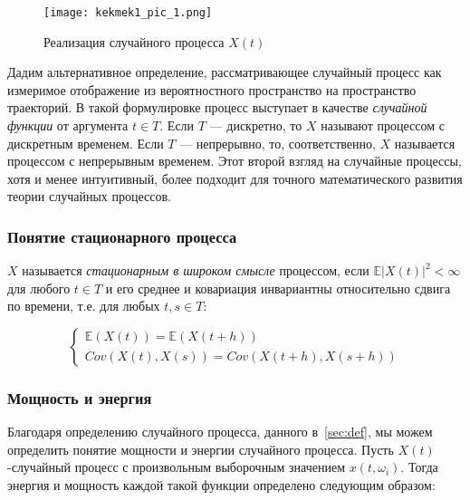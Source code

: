 \begin{figure}[b]
\centering
\texttt{[image: kekmek1\_pic\_1.png]}
\caption{Реализация случайного процесса $X(t)$}
\label{fig:X}
\end{figure}

Дадим альтернативное определение, рассматривающее случайный процесс как измеримое отображение из вероятностного пространство на пространство траекторий. В такой формулировке процесс выступает в качестве \textsl{случайной функции} от аргумента $t \in T$. Если $T$ — дискретно, то $X$ называют процессом с дискретным временем. Если $T$ — непрерывно, то, соответственно, $X$ называется процессом с непрерывным временем. Этот второй взгляд на случайные процессы, хотя и менее интуитивный, более подходит для точного математического развития теории случайных процессов.
\newpage
\subsubsection{Понятие стационарного процесса}


\begin{definition} $X$ называется \textsl{стационарным в широком смысле} процессом, если $\mathbb{E}|X(t)|^{2} < \infty$ для любого $t \in T$ и его среднее и ковариация инвариантны относительно сдвига по времени, т.е. для любых $t, s \in T$:

{\centering 
\begin{equation}
\left\{
    \begin{array}{lr}
        \mathbb{E}(X(t)) = \mathbb{E}(X(t+h)) \\
         Cov(X(t), X(s)) =  Cov(X(t+h), X(s+h))
    \end{array} 
\right.
\end{equation}
}
\end{definition}

\subsubsection{Мощность и энергия}
Благодаря определению случайного процесса, данного в~\ref{sec:def}, мы можем определить понятие мощности и энергии случайного процесса. Пусть $X(t)$-случайный процесс с произвольным выборочным значением $x(t, \omega_{i})$. Тогда энергия и мощность каждой такой функции определено следующим образом:

